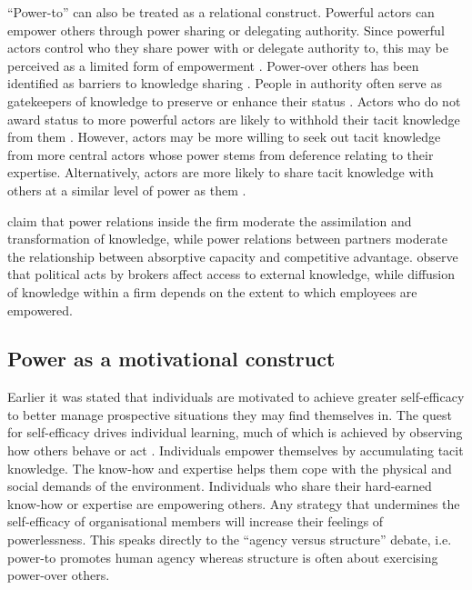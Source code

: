 \enquote{Power-to} can also be treated as a relational construct. Powerful actors can empower others through power sharing or delegating authority. Since powerful actors control who they share power with or delegate authority to, this may be perceived as a limited form of empowerment \citep{conger1988empowerment}. Power-over others has been identified as barriers to knowledge sharing \citep{riege2005three,suppiah2011organisational}. People in authority often serve as gatekeepers of knowledge to preserve or enhance their status \citep{cross2001beyond}. Actors who do not award status to more powerful actors are likely to withhold their tacit knowledge from them \citep{cabrera2006determinants}. However, actors may be more willing to seek out tacit knowledge from more central actors whose power stems from deference relating to their expertise. Alternatively, actors are more likely to share tacit knowledge with others at a similar level of power as them \citep{cabrera2006determinants}. \medskip

\citet{todorova2007absorptive} claim that power relations inside the firm moderate the assimilation and transformation of knowledge, while power relations between partners moderate the relationship between absorptive capacity and competitive advantage. \citet{easterby2008absorptive} observe that political acts by brokers affect access to external knowledge, while diffusion of knowledge within a firm depends on the extent to which employees are empowered. 

\subsection{Power as a motivational construct}

Earlier it was stated that individuals are motivated to achieve greater self-efficacy to better manage prospective situations they may find themselves in. The quest for self-efficacy drives individual learning, much of which is achieved by observing how others behave or act \citep{bandura1994self}. Individuals empower themselves by accumulating tacit knowledge. The know-how and expertise helps them cope with the physical and social demands of the environment. Individuals who share their hard-earned know-how or expertise are empowering others. Any strategy that undermines the self-efficacy of organisational members will increase their feelings of powerlessness. This speaks directly to the \enquote{agency versus structure} debate, i.e. power-to promotes human agency whereas structure is often about exercising power-over others.

